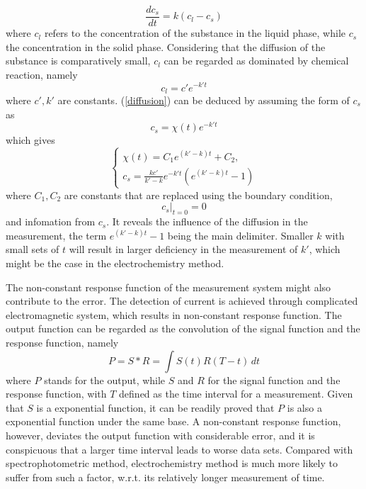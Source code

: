\documentclass[%
 reprint,
 amsmath,amssymb,
 aps,
10.5pt,
]{revtex4-1}
\begin{document}
\begin{equation}
	\frac{d c_s}{dt} = k (c_l - c_s)
\label{diffusion}
\end{equation}
where $c_l$ refers to the concentration of the substance in the liquid phase, while $c_s$ the concentration in the solid phase. Considering that the diffusion of the substance is comparatively small, $c_l$ can be regarded as dominated by chemical reaction, namely
\begin{equation}
	c_l = c' e^{-k't}
\end{equation}
where $c',k'$ are constants. (\ref{diffusion}) can be deduced by assuming the form of $c_s$ as
\begin{equation}
	c_s = \chi(t) e^{-k't}
\end{equation}
which gives
\begin{equation}
\begin{cases}
	\chi(t) = C_1 e^{(k'-k) t} + C_2,\\
	 c_s = \frac{k c'}{k'-k} e^{-k't}(e^{(k'-k)t}-1)
	 \end{cases}
\end{equation}
where $C_1,C_2$ are constants that are replaced using the boundary condition,
\begin{equation}
	c_s \big|_{t=0} = 0
\end{equation}
and infomation from $c_s$.
It reveals the influence of the diffusion in the measurement, the term $e^{(k'-k)t}-1$ being the main delimiter. Smaller $k$ with small sets of $t$ will result in larger deficiency in the measurement of $k'$, which might be the case in the electrochemistry method.

The non-constant response function of the measurement system might also contribute to the error. The detection of current is achieved through complicated electromagnetic system, which results in non-constant response function. The output function can be regarded as the convolution of the signal function and the response function, namely
\begin{equation}
	P = S * R = \int S(t) R(T-t) \, dt
\end{equation}
where $P$ stands for the output, while $S$ and $R$ for the signal function and the response function, with $T$ defined as the time interval for a measurement. Given that $S$ is a exponential function, it can be readily proved that $P$ is also a exponential function under the same base. A non-constant response function, however, deviates the output function with considerable error, and it is conspicuous that a larger time interval leads to worse data sets. Compared with spectrophotometric method, electrochemistry method is much more likely to suffer from such a factor, w.r.t. its relatively longer measurement of time.





\end{document}
